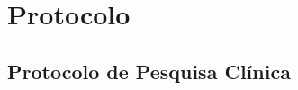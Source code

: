 \documentclass{beamer}
\begin{document}


\section{Protocolo}

\subsection{Protocolo de Pesquisa Clínica}
\end{document}
